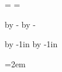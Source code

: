 








\headline={}
\footline={}


\hsize=210mm
\vsize=297mm


\advance\voffset by -\voffset
\advance\hoffset by -\hoffset

\advance\voffset by -1in
\advance\hoffset by -1in


\newskip\titleskip
\titleskip=8pt

\newskip\posttitleskip
\posttitleskip=0pt

\newskip\basichskip
\basichskip=2em


